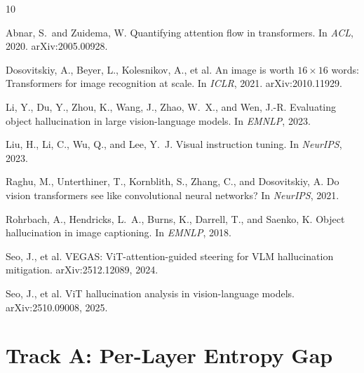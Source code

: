 \documentclass[11pt]{article}
\begin{document}

\begin{thebibliography}{10}

Abnar, S.\ and Zuidema, W.
\newblock Quantifying attention flow in transformers.
\newblock In \textit{ACL}, 2020. arXiv:2005.00928.

Dosovitskiy, A., Beyer, L., Kolesnikov, A., et al.
\newblock An image is worth $16{\times}16$ words: Transformers for image
  recognition at scale.
\newblock In \textit{ICLR}, 2021. arXiv:2010.11929.

Li, Y., Du, Y., Zhou, K., Wang, J., Zhao, W.\ X., and Wen, J.-R.
\newblock Evaluating object hallucination in large vision-language models.
\newblock In \textit{EMNLP}, 2023.

Liu, H., Li, C., Wu, Q., and Lee, Y.\ J.
\newblock Visual instruction tuning.
\newblock In \textit{NeurIPS}, 2023.

Raghu, M., Unterthiner, T., Kornblith, S., Zhang, C., and Dosovitskiy, A.
\newblock Do vision transformers see like convolutional neural networks?
\newblock In \textit{NeurIPS}, 2021.

Rohrbach, A., Hendricks, L.\ A., Burns, K., Darrell, T., and Saenko, K.
\newblock Object hallucination in image captioning.
\newblock In \textit{EMNLP}, 2018.

Seo, J., et al.
\newblock VEGAS: ViT-attention-guided steering for VLM hallucination
  mitigation.
\newblock arXiv:2512.12089, 2024.

Seo, J., et al.
\newblock ViT hallucination analysis in vision-language models.
\newblock arXiv:2510.09008, 2025.

\end{thebibliography}

\appendix

\section{Track A: Per-Layer Entropy Gap}
\end{document}

